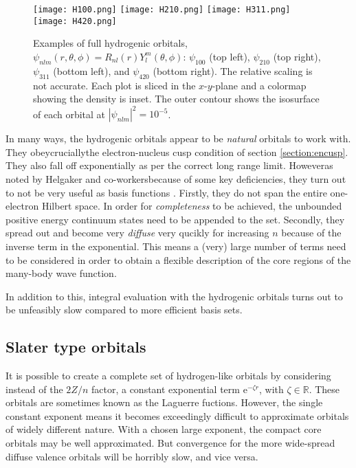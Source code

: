 \documentclass[../../master.tex]{subfiles}
\begin{document}
\vspace{600pt}
\begin{figure}
\centering
\texttt{[image: H100.png]}
\texttt{[image: H210.png]}
\texttt{[image: H311.png]}
\texttt{[image: H420.png]}
\caption{Examples of full hydrogenic orbitals, $\psi_{nlm}(r,\theta,\phi)=R_{nl}(r)Y^m_l(\theta,\phi)$: $\psi_{100}$ (top left), $\psi_{210}$ (top right), $\psi_{311}$ (bottom left), and $\psi_{420}$ (bottom right). The relative scaling is not accurate. Each plot is sliced in the $x$-$y$-plane and a colormap showing the density is inset. The outer contour shows the isosurface of each orbital at $|\psi_{nlm}|^2=10^{-5}$. \label{fig:hydrogenorbital3d}}
\end{figure}

In many ways, the hydrogenic orbitals appear to be \emph{natural} orbitals to work with. They obey\textemdash crucially\textemdash the electron-nucleus cusp condition of section \ref{section:encusp}. They also fall off exponentially as per the correct long range limit. However\textemdash as noted by Helgaker and co-workers\textemdash because of some key deficiencies, they turn out to not be very useful as basis functions \cite{helgaker}. Firstly, they do not span the entire one-electron Hilbert space. In order for \emph{completeness} to be achieved, the unbounded positive energy continuum states need to be appended to the set. Secondly, they spread out and become very \emph{diffuse} very qucikly for increasing $n$ because of the inverse term in the exponential. This means a (very) large number of terms need to be considered in order to obtain a flexible description of the core regions of the many-body wave function. 

In addition to this, integral evaluation with the hydrogenic orbitals turns out to be unfeasibly slow compared to more efficient basis sets. 

\subsection{Slater type orbitals}
It is possible to create a complete set of hydrogen-like orbitals by considering instead of the $2Z/n$ factor, a constant exponential term $\mathrm{e}^{-\zeta r}$, with $\zeta\in\mathbb{R}$. These orbitals are sometimes known as the Laguerre fuctions. However, the single constant exponent means it becomes exceedingly difficult to approximate orbitals of widely different nature. With a chosen large exponent, the compact core orbitals may be well approximated. But convergence for the more wide-spread diffuse valence orbitals will be horribly slow, and vice versa.
\end{document}
